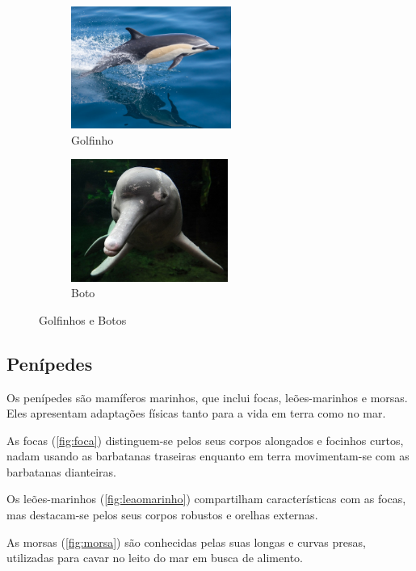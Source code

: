 \documentclass{report}
\begin{document}
\begin{figure}[H]
\center
    	\begin{subfigure}{.5\textwidth}
    	\center
        	\includegraphics[height=4cm]{imagens/golfinhocomum.jpg}
        	\caption{Golfinho}
        	\label{fig:golfinho}
    	\end{subfigure}%
   	\begin{subfigure}{.5\textwidth}
    	\center
        	\includegraphics[height=4cm]{imagens/boto.jpg}
        	\caption{Boto}
       	\label{fig:boto}
    	\end{subfigure}
    \caption{Golfinhos e Botos}
    	\label{fig:golfinhosbotos}
\end{figure}
	

\subsection{Penípedes}
Os penípedes são mamíferos marinhos, que inclui focas, leões-marinhos e morsas. Eles apresentam adaptações físicas tanto para a vida em terra como no mar.

As focas (\ref{fig:foca}) distinguem-se pelos seus corpos alongados e focinhos curtos, nadam usando as barbatanas traseiras enquanto em terra movimentam-se com as barbatanas dianteiras.

Os leões-marinhos (\ref{fig:leaomarinho}) compartilham características com as focas, mas destacam-se pelos seus corpos robustos e orelhas externas.
	
As morsas (\ref{fig:morsa}) são conhecidas pelas suas longas e curvas presas, utilizadas para cavar no leito do mar em busca de alimento.
\end{document}

